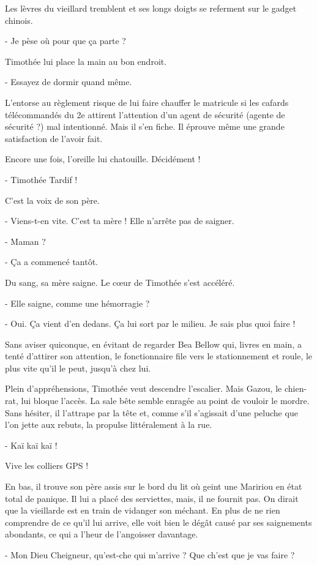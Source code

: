 Les lèvres du vieillard tremblent et ses longs doigts se referment sur le gadget chinois.

- Je pèse où pour que ça parte ?

Timothée lui place la main au bon endroit.

- Essayez de dormir quand même.

L’entorse au règlement risque de lui faire chauffer le matricule si les cafards télécommandés du 2e attirent l’attention d’un agent de sécurité (agente de sécurité ?) mal intentionné. Mais il s’en fiche. Il éprouve même une grande satisfaction de l’avoir fait.

Encore une fois, l’oreille lui chatouille. Décidément !

- Timothée Tardif !

C’est la voix de son père.

- Viens-t-en vite. C’est ta mère ! Elle n’arrête pas de saigner.

- Maman ?

- Ça a commencé tantôt.

Du sang, sa mère saigne. Le cœur de Timothée s’est accéléré.

- Elle saigne, comme une hémorragie ?

- Oui. Ça vient d’en dedans. Ça lui sort par le milieu. Je sais plus quoi faire !

Sans aviser quiconque, en évitant de regarder Bea Bellow qui, livres en main, a tenté d’attirer son attention, le fonctionnaire file vers le stationnement et roule, le plus vite qu’il le peut, jusqu’à chez lui.

Plein d’appréhensions, Timothée veut descendre l’escalier. Mais Gazou, le chien-rat, lui bloque l’accès. La sale bête semble enragée au point de vouloir le mordre. Sans hésiter, il l’attrape par la tête et, comme s’il s’agissait d’une peluche que l’on jette aux rebuts, la propulse littéralement à la rue.

- Kaï kaï kaï !

Vive les colliers GPS !

En bas, il trouve son père assis sur le bord du lit où geint une Maririou en état total de panique. Il lui a placé des serviettes, mais, il ne fournit pas. On dirait que la vieillarde est en train de vidanger son méchant. En plus de ne rien comprendre de ce qu’il lui arrive, elle voit bien le dégât causé par ses saignements abondants, ce qui a l’heur de l’angoisser davantage.

- Mon Dieu Cheigneur, qu’est-che qui m’arrive ? Que ch’est que je vas faire ?

